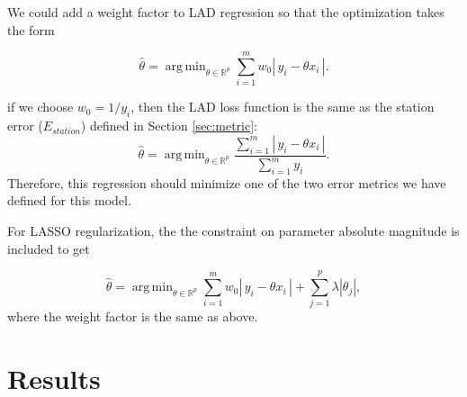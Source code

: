 \documentclass[11pt]{article}
\DeclareMathOperator*{\argmin}{arg\,min}
\begin{document}
We could add a weight factor to LAD regression so that the optimization takes the form

\[\hat{\theta} = \argmin_{\theta\in\mathbb{R}^p}\sum_{i=1}^m w_0\left|\,y_i - \theta x_i\,\right|.\]

if we choose $w_0 = 1 / y_i$, then the LAD loss function is the same as the station error ($E_{station}$) defined in Section \ref{sec:metric}:
\[\hat{\theta} = \argmin_{\theta\in\mathbb{R}^p}\displaystyle\frac{\sum\limits_{i=1}^m \left|\,y_i - \theta x_i\,\right|}{\sum\limits_{i=1}^{m}y_i}.\] Therefore, this regression should minimize one of the two error metrics we have defined for this model. 

For LASSO regularization, the the constraint on parameter absolute magnitude is included to get

\[\hat{\theta} = \argmin_{\theta\in\mathbb{R}^p}\sum_{i=1}^m w_0\left|\,y_i - \theta x_i\,\right| + \sum_{j=1}^p\lambda\left|\theta_j\right|,\] where the weight factor is the same as above.






\section{Results}
\end{document}
